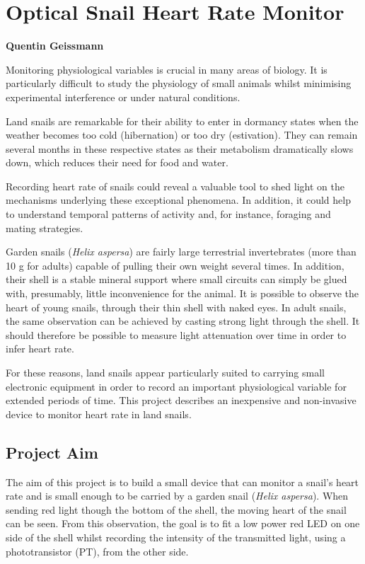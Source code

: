 \documentclass[]{article}
\date{}
\begin{document}
\section{Optical Snail Heart Rate
Monitor}\label{optical-snail-heart-rate-monitor}

\textbf{Quentin Geissmann}

Monitoring physiological variables is crucial in many areas of biology.
It is particularly difficult to study the physiology of small animals
whilst minimising experimental interference or under natural conditions.

Land snails are remarkable for their ability to enter in dormancy states
when the weather becomes too cold (hibernation) or too dry (estivation).
They can remain several months in these respective states as their
metabolism dramatically slows down, which reduces their need for food
and water.

Recording heart rate of snails could reveal a valuable tool to shed
light on the mechanisms underlying these exceptional phenomena. In
addition, it could help to understand temporal patterns of activity and,
for instance, foraging and mating strategies.

Garden snails (\emph{Helix aspersa}) are fairly large terrestrial
invertebrates (more than 10 g for adults) capable of pulling their own
weight several times. In addition, their shell is a stable mineral
support where small circuits can simply be glued with, presumably,
little inconvenience for the animal. It is possible to observe the heart
of young snails, through their thin shell with naked eyes. In adult
snails, the same observation can be achieved by casting strong light
through the shell. It should therefore be possible to measure light
attenuation over time in order to infer heart rate.

For these reasons, land snails appear particularly suited to carrying
small electronic equipment in order to record an important physiological
variable for extended periods of time. This project describes an
inexpensive and non-invasive device to monitor heart rate in land
snails.

\subsection{Project Aim}\label{project-aim}

The aim of this project is to build a small device that can monitor a
snail's heart rate and is small enough to be carried by a garden snail
(\emph{Helix aspersa}). When sending red light though the bottom of the
shell, the moving heart of the snail can be seen. From this observation,
the goal is to fit a low power red LED on one side of the shell whilst
recording the intensity of the transmitted light, using a
phototransistor (PT), from the other side.
\end{document}

